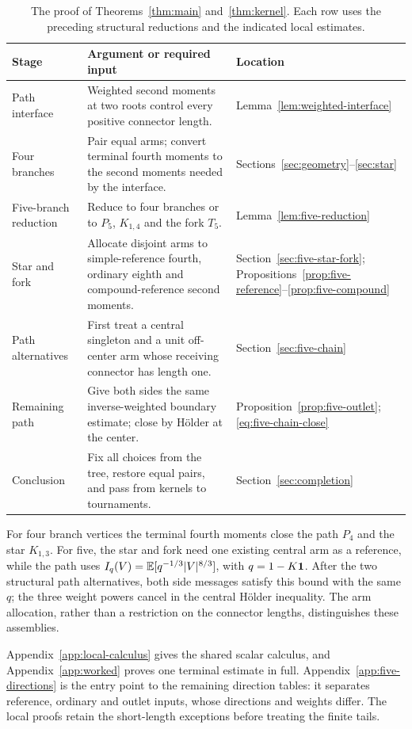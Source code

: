 \begin{table}[htbp]\centering\small
\caption{The proof of Theorems~\ref{thm:main} and~\ref{thm:kernel}. Each row uses the preceding structural reductions and the indicated local estimates.}\label{tab:proof-route}
\begin{tabular}{@{}p{29mm}p{77mm}p{39mm}@{}}\toprule
Stage & Argument or required input & Location\\\midrule
Path interface & Weighted second moments at two roots control every positive connector length. & Lemma~\ref{lem:weighted-interface}\\
Four branches & Pair equal arms; convert terminal fourth moments to the second moments needed by the interface. & Sections~\ref{sec:geometry}--\ref{sec:star}\\
Five-branch reduction & Reduce to four branches or to $P_5$, $K_{1,4}$ and the fork $T_5$. & Lemma~\ref{lem:five-reduction}\\
Star and fork & Allocate disjoint arms to simple-reference fourth, ordinary eighth and compound-reference second moments. & Section~\ref{sec:five-star-fork}; Propositions~\ref{prop:five-reference}--\ref{prop:five-compound}\\
Path alternatives & First treat a central singleton and a unit off-center arm whose receiving connector has length one. & Section~\ref{sec:five-chain}\\
Remaining path & Give both sides the same inverse-weighted boundary estimate; close by H\"older at the center. & Proposition~\ref{prop:five-outlet}; \eqref{eq:five-chain-close}\\
Conclusion & Fix all choices from the tree, restore equal pairs, and pass from kernels to tournaments. & Section~\ref{sec:completion}\\\bottomrule
\end{tabular}
\end{table}

For four branch vertices the terminal fourth moments close the path
$P_4$ and the star $K_{1,3}$. For five, the star and fork need one
existing central arm as a reference, while the path uses
$I_q(V)=\mathbb E[q^{-1/3}|V|^{8/3}]$, with $q=1-K\mathbf1$.
After the two structural path alternatives, both side messages satisfy
this bound with the same $q$; the three weight powers cancel in the
central H\"older inequality. The arm allocation, rather than a
restriction on the connector lengths, distinguishes these assemblies.

Appendix~\ref{app:local-calculus} gives the shared scalar calculus,
and Appendix~\ref{app:worked} proves one terminal estimate in full.
Appendix~\ref{app:five-directions} is the entry point to the remaining
direction tables: it separates reference, ordinary and outlet inputs,
whose directions and weights differ. The local proofs retain the
short-length exceptions before treating the finite tails.

